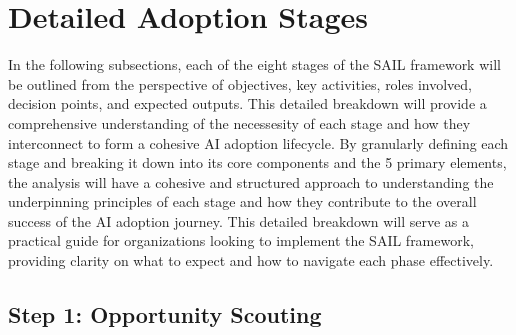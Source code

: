 \documentclass[]{imc-inf}
\begin{document}
\section{Detailed Adoption
	Stages}\label{detailed-adoption-stages}

In the following subsections, each of the eight stages of the SAIL
framework will be outlined from the perspective of objectives, key
activities, roles involved, decision points, and expected outputs. This
detailed breakdown will provide a comprehensive understanding of the
necessesity of each stage and how they interconnect to form a cohesive
AI adoption lifecycle. By granularly defining each stage and breaking it
down into its core components and the 5 primary elements, the analysis
will have a cohesive and structured approach to understanding the
underpinning principles of each stage and how they contribute to the
overall success of the AI adoption journey. This detailed breakdown will
serve as a practical guide for organizations looking to implement the
SAIL framework, providing clarity on what to expect and how to navigate
each phase effectively.

\subsection{Step 1: Opportunity
	Scouting}\label{step-1-opportunity-scouting}
\end{document}

